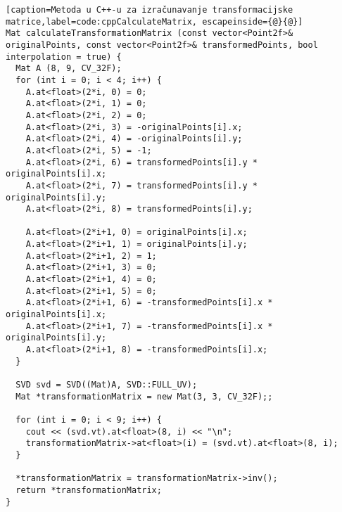 \begin{lstlisting}[caption=Metoda u C++-u za izračunavanje transformacijske matrice,label=code:cppCalculateMatrix, escapeinside={@}{@}]
Mat calculateTransformationMatrix (const vector<Point2f>& originalPoints, const vector<Point2f>& transformedPoints, bool interpolation = true) {
  Mat A (8, 9, CV_32F);
  for (int i = 0; i < 4; i++) {
    A.at<float>(2*i, 0) = 0;
    A.at<float>(2*i, 1) = 0;
    A.at<float>(2*i, 2) = 0;
    A.at<float>(2*i, 3) = -originalPoints[i].x;
    A.at<float>(2*i, 4) = -originalPoints[i].y;
    A.at<float>(2*i, 5) = -1;
    A.at<float>(2*i, 6) = transformedPoints[i].y * originalPoints[i].x;
    A.at<float>(2*i, 7) = transformedPoints[i].y * originalPoints[i].y;
    A.at<float>(2*i, 8) = transformedPoints[i].y;
    
    A.at<float>(2*i+1, 0) = originalPoints[i].x;
    A.at<float>(2*i+1, 1) = originalPoints[i].y;
    A.at<float>(2*i+1, 2) = 1;
    A.at<float>(2*i+1, 3) = 0;
    A.at<float>(2*i+1, 4) = 0;
    A.at<float>(2*i+1, 5) = 0;
    A.at<float>(2*i+1, 6) = -transformedPoints[i].x * originalPoints[i].x;
    A.at<float>(2*i+1, 7) = -transformedPoints[i].x * originalPoints[i].y;
    A.at<float>(2*i+1, 8) = -transformedPoints[i].x;
  }

  SVD svd = SVD((Mat)A, SVD::FULL_UV);
  Mat *transformationMatrix = new Mat(3, 3, CV_32F);;

  for (int i = 0; i < 9; i++) {
    cout << (svd.vt).at<float>(8, i) << "\n";
    transformationMatrix->at<float>(i) = (svd.vt).at<float>(8, i);
  }

  *transformationMatrix = transformationMatrix->inv();
  return *transformationMatrix;
}
\end{lstlisting}
